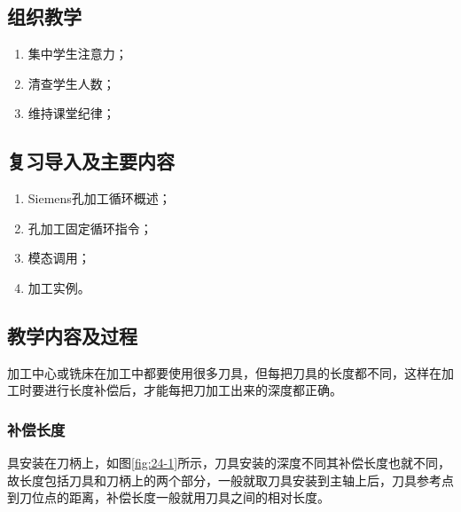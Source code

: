 \jxhj{%
	}

\makeshouye %

\subsection{组织教学}
\begin{enumerate}[\hspace{2em}1、]
	\item 集中学生注意力；
	\item 清查学生人数；
	\item 维持课堂纪律；
\end{enumerate}

\subsection{复习导入及主要内容}
\begin{enumerate}[1、]
\item Siemens孔加工循环概述；
\item 孔加工固定循环指令；
\item 模态调用；
\item 加工实例。
\end{enumerate}

\subsection{教学内容及过程}

加工中心或铣床在加工中都要使用很多刀具，但每把刀具的长度都不同，这样在加工时要进行长度补偿后，才能每把刀加工出来的深度都正确。

\subsubsection{补偿长度}
具安装在刀柄上，如图\ref{fig:24-1}所示，刀具安装的深度不同其补偿长度也就不同，故长度包括刀具和刀柄上的两个部分，一般就取刀具安装到主轴上后，刀具参考点到刀位点的距离，补偿长度一般就用刀具之间的相对长度。

